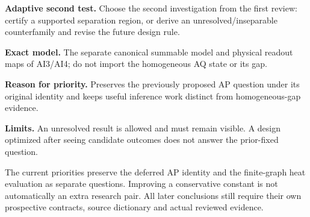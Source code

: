 \textbf{Adaptive second test.} Choose the second investigation from the first review: certify a supported separation region, or derive an unresolved/inseparable counterfamily and revise the future design rule.

\textbf{Exact model.} The separate canonical summable model and physical readout maps of AI3/AI4; do not import the homogeneous AQ state or its gap.

\textbf{Reason for priority.} Preserves the previously proposed AP question under its original identity and keeps useful inference work distinct from homogeneous-gap evidence.

\textbf{Limits.} An unresolved result is allowed and must remain visible. A design optimized after seeing candidate outcomes does not answer the prior-fixed question.

The current priorities preserve the deferred AP identity and the finite-graph heat evaluation as separate questions. Improving a conservative constant is not automatically an extra research pair. All later conclusions still require their own prospective contracts, source dictionary and actual reviewed evidence.
